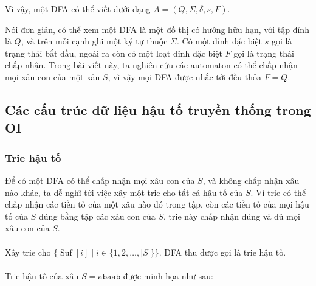 \documentclass[11pt]{article}
\begin{document}
Vì vậy, một DFA có thể viết dưới dạng \(A=(Q,\Sigma,\delta,s,F)\).

Nói đơn giản, có thể xem một DFA là một đồ thị có hướng hữu hạn, với tập đỉnh
là \(Q\), và trên mỗi cạnh ghi một ký tự thuộc \(\Sigma\). Có một đỉnh đặc biệt
\(s\) gọi là trạng thái bắt đầu, ngoài ra còn có một loạt đỉnh đặc biệt \(F\)
gọi là trạng thái chấp nhận. Trong bài viết này, ta nghiên cứu các automaton có
thể chấp nhận mọi xâu con của một xâu \(S\), vì vậy mọi DFA được nhắc tới đều
thỏa \(F=Q\).

\subsection{Các cấu trúc dữ liệu hậu tố truyền thống trong OI}

\subsubsection{Trie hậu tố}

Để có một DFA có thể chấp nhận mọi xâu con của \(S\), và không chấp nhận xâu
nào khác, ta dễ nghĩ tới việc xây một trie cho tất cả hậu tố của \(S\). Vì trie
có thể chấp nhận các tiền tố của một xâu nào đó trong tập, còn các tiền tố của
mọi hậu tố của \(S\) đúng bằng tập các xâu con của \(S\), trie này chấp nhận
đúng và đủ mọi xâu con của \(S\).

\paragraph{}
Xây trie cho \(\{\operatorname{Suf}[i]\mid i\in\{1,2,\ldots,|S|\}\}\). DFA thu
được gọi là trie hậu tố.

\paragraph{}
Trie hậu tố của xâu \(S=\texttt{abaab}\) được minh họa như sau:
\end{document}
